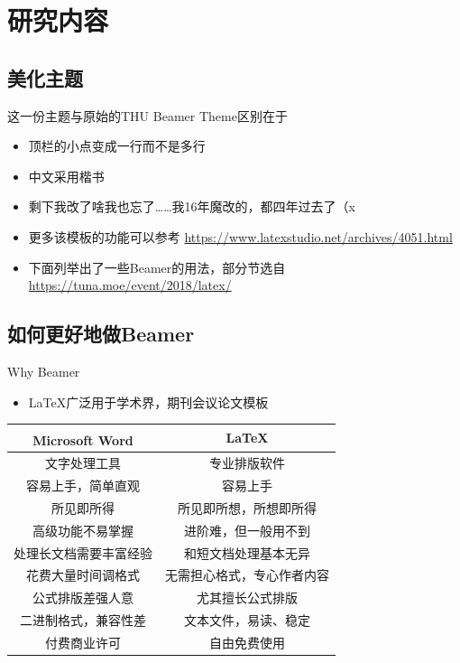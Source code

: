 \documentclass{beamer}
\begin{document}
\section{研究内容}

\subsection{美化主题}

\begin{frame}{这一份主题与原始的THU Beamer Theme区别在于}
\begin{itemize}
\item 顶栏的小点变成一行而不是多行
\item 中文采用楷书
\item 剩下我改了啥我也忘了……我16年魔改的，都四年过去了（x
\item 更多该模板的功能可以参考 \url{https://www.latexstudio.net/archives/4051.html}
\item 下面列举出了一些Beamer的用法，部分节选自 \url{https://tuna.moe/event/2018/latex/}
\end{itemize}
\end{frame}

\subsection{如何更好地做Beamer}

\begin{frame}{Why Beamer}
	\begin{itemize}
		\item \LaTeX 广泛用于学术界，期刊会议论文模板
	\end{itemize}
	\begin{table}[h]
		\centering
		\begin{tabular}{c|c}
			Microsoft\textsuperscript{\textregistered}  Word & \LaTeX \\
			\hline
			文字处理工具 & 专业排版软件 \\
			容易上手，简单直观 & 容易上手 \\
			所见即所得 & 所见即所想，所想即所得 \\
			高级功能不易掌握 & 进阶难，但一般用不到 \\
			处理长文档需要丰富经验 & 和短文档处理基本无异 \\
			花费大量时间调格式 & 无需担心格式，专心作者内容 \\
			公式排版差强人意 & 尤其擅长公式排版 \\
			二进制格式，兼容性差 & 文本文件，易读、稳定 \\
			付费商业许可 & 自由免费使用 \\
		\end{tabular}
	\end{table}
\end{frame}
\end{document}
